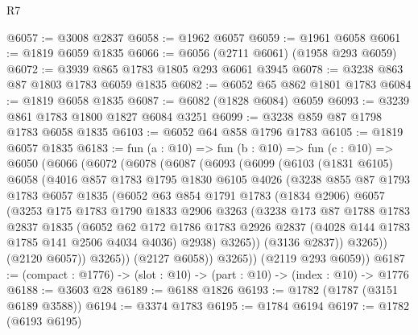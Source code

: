 \begin{lexlean}{R7}
\begin{coremodule}
@6057 := @3008 @2837
@6058 := @1962 @6057
@6059 := @1961 @6058
@6061 := @1819 @6059 @1835
@6066 := @6056 (@2711 @6061) (@1958 @293 @6059)
@6072 := @3939 @865 @1783 @1805 @293 @6061 @3945
@6078 := @3238 @863 @87 @1803 @1783 @6059 @1835
@6082 := @6052 @65 @862 @1801 @1783
@6084 := @1819 @6058 @1835
@6087 := @6082 (@1828 @6084) @6059
@6093 := @3239 @861 @1783 @1800 @1827 @6084 @3251
@6099 := @3238 @859 @87 @1798 @1783 @6058 @1835
@6103 := @6052 @64 @858 @1796 @1783
@6105 := @1819 @6057 @1835
@6183 := fun (a : @10) =>
  fun (b : @10) =>
  fun (c : @10) =>
  @6050
    (@6066
      (@6072
        (@6078
          (@6087
            (@6093
              (@6099
                (@6103
                  (@1831 @6105)
                  @6058
                  (@4016
                    @857
                    @1783
                    @1795
                    @1830
                    @6105
                    @4026
                    (@3238
                      @855
                      @87
                      @1793
                      @1783
                      @6057
                      @1835
                      (@6052
                        @63
                        @854
                        @1791
                        @1783
                        (@1834 @2906)
                        @6057
                        (@3253
                          @175
                          @1783
                          @1790
                          @1833
                          @2906
                          @3263
                          (@3238
                            @173
                            @87
                            @1788
                            @1783
                            @2837
                            @1835
                            (@6052
                              @62
                              @172
                              @1786
                              @1783
                              @2926
                              @2837
                              (@4028 @144 @1783 @1785 @141 @2506 @4034 @4036)
                              @2938)
                            @3265))
                        (@3136 @2837))
                      @3265))
                  (@2120 @6057))
                @3265))
            (@2127 @6058))
          @3265))
      (@2119 @293 @6059))
@6187 := (compact : @1776) -> (slot : @10) -> (part : @10) -> (index : @10) -> @1776
@6188 := @3603 @28
@6189 := @6188 @1826
@6193 := @1782 (@1787 (@3151 @6189 @3588))
@6194 := @3374 @1783
@6195 := @1784 @6194
@6197 := @1782 (@6193 @6195)

\end{coremodule}
\end{lexlean}
